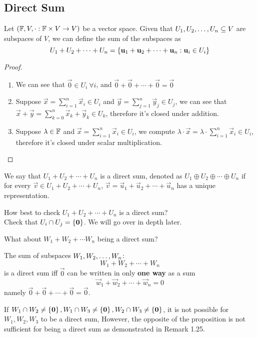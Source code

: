 \subsection{Direct Sum}
\begin{definition}
    Let $(\mathbb F, V, \cdot : \mathbb F \times V \to V)$ be a vector space. Given that ${U}_1,{U}_2, \ldots, {U}_{n} \subseteq V$ are subspaces of $V$, we can define the sum of the subspaces as 
    \[ U_1 + U_2 + \cdots + U_n = \left\{ \mathbf u_1 + \mathbf u_2 + \cdots + \mathbf u_n : \mathbf u_i \in U_i \right\} \]
\end{definition}
\begin{proof}
    \begin{enumerate} [label  = \arabic*)]
        \item We can see that $\vec 0 \in U_i \ \forall i$, and $\vec 0 + \vec 0 + \cdots + \vec 0 = \vec 0$
        \item Suppose $\vec x = \sum_{i = 1}^n \vec x_i \in U_i$ and $\vec  y = \sum_{j = 1}^n \vec y_j \in U_j$, we can see that $\vec x + \vec y = \sum_{k = 0}^n \vec x_k + \vec y_k \in U_k$, therefore it's closed under addition.
        \item Suppose $\lambda \in \mathbb F$ and $\vec x = \sum_{i = 1}^n \vec x_i \in U_i$, we compute $\lambda \cdot \vec x = \lambda \cdot \sum_{i = 1}^n \vec x_i \in U_i$, therefore it's closed under scalar multiplication.
    \end{enumerate}
\end{proof}
\begin{definition}
    We say that $U_1 + U_2 + \cdots + U_n$ is a direct sum, denoted as $U_1 \oplus U_2 \oplus \cdots \oplus U_n$ if for every $\vec v \in U_1 + U_2 + \cdots + U_n$, $\vec v = \vec u_1 + \vec u_2 + \cdots + \vec u_n$ has a unique representation. 
\end{definition} 
\begin{remark}
    How best to check $U_1 + U_2 + \cdots + U_n$ is a direct sum? \\
    Check that $U_i \cap U_j = \left\{ \mathbf 0 \right\}$. We will go over in depth later.
\end{remark}
What about $W_1 + W_2 + \cdots W_n$ being a direct sum?
\begin{theorem}
    The sum of subspaces ${W}_1,{W}_2, \ldots, {W}_{n}$: 
    \[W_1 + W_2 + \cdots + W_n\]
    is a direct sum iff $\vec 0$ can be written in only \textbf{one way} as a sum 
    \[ \vec w_1 + \vec w_2 + \cdots + \vec w_n = 0\]
    namely $\vec 0 + \vec 0 + \cdots + \vec 0 = \vec 0$.
\end{theorem}
\begin{remark}
    If $W_1 \cap W_2 \neq \left\{ \mathbf 0 \right\}, W_1 \cap W_3 \neq \left\{ \mathbf 0 \right\}, W_2 \cap W_3 \neq \left\{ \mathbf 0 \right\}$, it is not possible for $W_1,W_2,W_3$ to be a direct sum, However, the opposite of the proposition is not sufficient for being a direct sum as demonstrated in Remark 1.25.
\end{remark}
